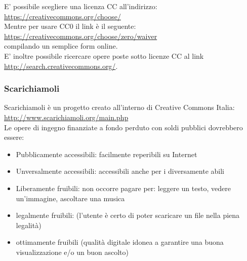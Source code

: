 E' possibile scegliere una licenza CC all'indirizzo: \\

\url{https://creativecommons.org/choose/}\\

Mentre per usare CC0 il link è il seguente: \\

\url{https://creativecommons.org/choose/zero/waiver}\\

compilando un semplice form online.\\

E' inoltre possibile ricercare opere poste sotto licenze CC al link \\

\url{http://search.creativecommons.org/}.\\

\subsubsection{Scarichiamoli}

Scarichiamoli è un progetto creato all'interno di Creative Commons
Italia: \\

\url{http://www.scarichiamoli.org/main.php} \\

Le opere di ingegno finanziate a fondo perduto con soldi pubblici dovrebbero essere:

\begin{itemize}
\item Pubblicamente accessibili: facilmente reperibili su Internet
\item Unversalmente accessibili: accessibili anche per i diversamente abili
\item Liberamente fruibili: non occorre pagare per: leggere un testo, vedere un'immagine, ascoltare una musica
\item legalmente fruibili: (l'utente è certo di poter scaricare un file nella piena legalità)
\item ottimamente fruibili (qualità digitale idonea a garantire una buona visualizzazione e/o un buon ascolto)
\end{itemize}